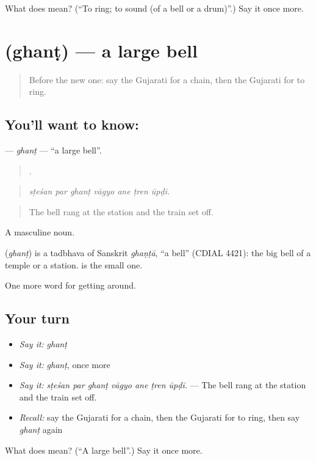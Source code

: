 \begin{tcolorbox}[breakable,colback=teal!4,colframe=teal!35!black,title={Before you move on}]
What does  mean? (\textquotedblleft{}To ring; to sound (of a bell or a drum)\textquotedblright{}.) Say it once more.
\end{tcolorbox}
\section[\texorpdfstring{\gu{ઘંટ} (ghanṭ)}{ઘંટ (ghanṭ)}]{ (ghanṭ) — a large bell}

\label{lesson:GU-C396-ghant}



\begin{quote}
Before the new one: say the Gujarati for a chain, then the Gujarati for to ring.
\end{quote}

\subsection*{You'll want to know: }
\textbf{} — \emph{ghanṭ} — \textquotedblleft{}a large bell\textquotedblright{}.

\begin{quote}
      .
\end{quote}

\begin{quote}
\emph{sṭeśan par ghanṭ vāgyo ane ṭren ūpḍī.}
\end{quote}

\begin{quote}
The bell rang at the station and the train set off.
\end{quote}

A masculine noun.

\begin{cousinweb}
\textbf{} (\emph{ghanṭ}) is a tadbhava of Sanskrit \emph{ghaṇṭā}, \textquotedblleft{}a bell\textquotedblright{} (CDIAL 4421): the big bell of a temple or a station.  is the small one.
\end{cousinweb}

\begin{grammarlens}[title={What you've built}]
One more word for getting around.
\end{grammarlens}

\subsection*{Your turn}
\begin{itemize}
\raggedright
  \item \emph{Say it:} \emph{ghanṭ}
  \item \emph{Say it:} \emph{ghanṭ}, once more
  \item \emph{Say it:} \emph{sṭeśan par ghanṭ vāgyo ane ṭren ūpḍī.} — The bell rang at the station and the train set off.
  \item \emph{Recall:} say the Gujarati for a chain, then the Gujarati for to ring, then say \emph{ghanṭ} again
\end{itemize}

\begin{tcolorbox}[breakable,colback=teal!4,colframe=teal!35!black,title={Before you move on}]
What does  mean? (\textquotedblleft{}A large bell\textquotedblright{}.) Say it once more.
\end{tcolorbox}
